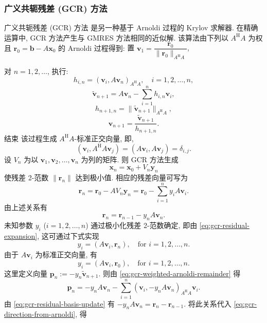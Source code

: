 \subsubsection{{广义共轭残差 (GCR) 方法}}\label{subsec:gcr-method}
{广义共轭残差 (GCR) 方法  是另一种基于 Arnoldi 过程的 Krylov 求解器. 在精确运算中, GCR 方法产生与 GMRES 方法相同的近似解. 该算法由下列以 $A^{\mathrm H}A$ 为权且 $\bm r_0=\bm b-A\bm x_0$ 的 Arnoldi 过程得到:}
{置} $\bm v_1=\dfrac{\bm r_0}{\|\bm r_0\|_{A^{\mathrm H}A}}$,\par
{对 $n=1,2,\ldots$, 执行:}
\[h_{i,n}=(\bm v_i,A\bm v_n)_{A^{\mathrm H}A},\quad i=1,2,\ldots,n,\]
\begin{equation}\label{eq:gcr-weighted-arnoldi-remainder}\widetilde{\bm v}_{n+1}=A\bm v_n-\sum_{i=1}^nh_{i,n}\bm v_i,\end{equation}
\[h_{n+1,n}=\|\widetilde{\bm v}_{n+1}\|_{A^{\mathrm H}A},\]
\begin{equation}\label{eq:gcr-weighted-arnoldi-normalization}\bm v_{n+1}=\frac{\widetilde{\bm v}_{n+1}}{h_{n+1,n}}.\end{equation}
{结束}
{该过程生成 $A^{\mathrm H}A$-标准正交向量, 即,}
\[(\bm v_i,A^{\mathrm H}A\bm v_j)=(A\bm v_i,A\bm v_j)=\delta_{i,j}.\]
{设 $V_n$ 为以 $\bm v_1,\bm v_2,\ldots,\bm v_n$ 为列的矩阵. 则 GCR 方法生成}
\[\bm x_n=\bm x_0+V_n\bm y_n\]
{使残差 2-范数 $\|\bm r_n\|$ 达到极小值. 相应的残差向量可写为}
\begin{equation}\label{eq:gcr-residual-expansion}\bm r_n=\bm r_0-AV_n\bm y_n=\bm r_0-\sum_{i=1}^ny_iA\bm v_i.\end{equation}
{由上述关系有}
\begin{equation}\label{eq:gcr-residual-basis-update}\bm r_n=\bm r_{n-1}-y_nA\bm v_n.\end{equation}
{未知参数 $y_i$ ($i=1,2,\ldots,n$) 通过极小化残差 2-范数确定, 即由 \eqref{eq:gcr-residual-expansion}, 这可通过下式实现}
\[y_i=(A\bm v_i,\bm r_n),\quad\text{for }i=1,2,\ldots,n.\]
{由于 $A\bm v_i$ 为标准正交向量, 有}
\[y_i=(A\bm v_i,\bm r_0),\quad\text{for }i=1,2,\ldots,n.\]
{这里定义向量 $\bm p_n:=-y_n\widetilde{\bm v}_{n+1}$. 则由 \eqref{eq:gcr-weighted-arnoldi-remainder} 得}
\begin{equation}\label{eq:gcr-direction-from-arnoldi}\bm p_n=-y_nA\bm v_n-\sum_{i=1}^n(\bm v_i,-y_nA\bm v_n)_{A^{\mathrm H}A}\bm v_i.\end{equation}
{由 \eqref{eq:gcr-residual-basis-update} 有 $-y_nA\bm v_n=\bm r_n-\bm r_{n-1}$. 将此关系代入 \eqref{eq:gcr-direction-from-arnoldi}, 得}
